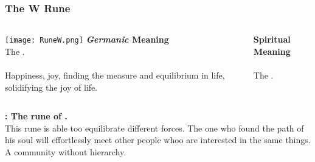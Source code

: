 \begin{frame}
\frametitle{The W Rune}
\begin{columns}[c] %

\texttt{[image: RuneW.png]}
\textbf{\textit{Germanic} Meaning}\\
The . \\
\\
Happiness, joy, finding the measure and equilibrium in life, solidifying the joy of life.

\textbf{Spiritual Meaning}\\
\\

The .
\end{columns}

\vspace{5mm}
\textbf{: The rune of .}\\
This rune is able too equilibrate different forces. The one who found the path of his soul will effortlessly meet other people whoo are interested in the same things. A community without hierarchy.
\end{frame}
